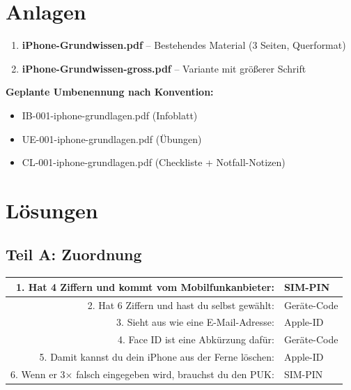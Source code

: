 \documentclass[11pt,a4paper]{article}
\begin{document}
\section{Anlagen}

\begin{enumerate}
    \item \textbf{iPhone-Grundwissen.pdf} -- Bestehendes Material (3 Seiten, Querformat)
    \item \textbf{iPhone-Grundwissen-gross.pdf} -- Variante mit größerer Schrift
\end{enumerate}

\textbf{Geplante Umbenennung nach Konvention:}
\begin{itemize}
    \item IB-001-iphone-grundlagen.pdf (Infoblatt)
    \item UE-001-iphone-grundlagen.pdf (Übungen)
    \item CL-001-iphone-grundlagen.pdf (Checkliste + Notfall-Notizen)
\end{itemize}

\section{Lösungen}

\subsection{Teil A: Zuordnung}

\begin{tabular}{|r|l|}
\hline
1. Hat 4 Ziffern und kommt vom Mobilfunkanbieter: & \textcolor{simblue}{SIM-PIN} \\
\hline
2. Hat 6 Ziffern und hast du selbst gewählt: & \textcolor{devicegreen}{Geräte-Code} \\
\hline
3. Sieht aus wie eine E-Mail-Adresse: & \textcolor{applered}{Apple-ID} \\
\hline
4. Face ID ist eine Abkürzung dafür: & \textcolor{devicegreen}{Geräte-Code} \\
\hline
5. Damit kannst du dein iPhone aus der Ferne löschen: & \textcolor{applered}{Apple-ID} \\
\hline
6. Wenn er 3× falsch eingegeben wird, brauchst du den PUK: & \textcolor{simblue}{SIM-PIN} \\
\hline
\end{tabular}
\end{document}
